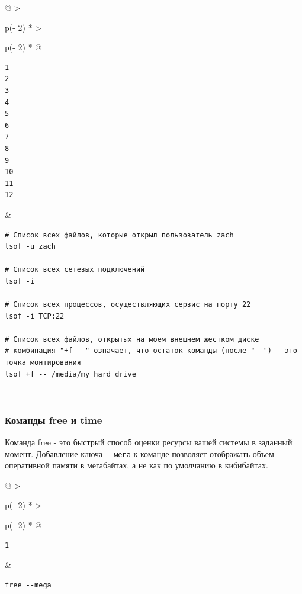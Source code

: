 \documentclass{report}
\begin{document}
\begin{longtable}[]{@{}
  >{\raggedright\arraybackslash}p{(\columnwidth - 2\tabcolsep) * }
  >{\raggedright\arraybackslash}p{(\columnwidth - 2\tabcolsep) * }@{}}
\toprule
\endhead
\begin{minipage}[t]{\linewidth}\raggedright
\begin{verbatim}
1
2
3
4
5
6
7
8
9
10
11
12
\end{verbatim}
\end{minipage} & \begin{minipage}[t]{\linewidth}\raggedright
\begin{verbatim}
# Список всех файлов, которые открыл пользователь zach
lsof -u zach

# Список всех сетевых подключений
lsof -i

# Список всех процессов, осуществляющих сервис на порту 22
lsof -i TCP:22

# Список всех файлов, открытых на моем внешнем жестком диске
# комбинация "+f --" означает, что остаток команды (после "--") - это точка монтирования
lsof +f -- /media/my_hard_drive
\end{verbatim}
\end{minipage} \\ \addlinespace
\bottomrule
\end{longtable}

\hypertarget{free-time}{%
\subsubsection{\texorpdfstring{\protect\hyperlink{free-time}{}Команды
free и time}{Команды free и time}}\label{free-time}}

Команда free - это быстрый способ оценки ресурсы вашей системы в
заданный момент. Добавление ключа \texttt{-\/-мега} к команде позволяет
отображать объем оперативной памяти в мегабайтах, а не как по умолчанию
в кибибайтах.

\begin{longtable}[]{@{}
  >{\raggedright\arraybackslash}p{(\columnwidth - 2\tabcolsep) * }
  >{\raggedright\arraybackslash}p{(\columnwidth - 2\tabcolsep) * }@{}}
\toprule
\endhead
\begin{minipage}[t]{\linewidth}\raggedright
\begin{verbatim}
1
\end{verbatim}
\end{minipage} & \begin{minipage}[t]{\linewidth}\raggedright
\begin{verbatim}
free --mega
\end{verbatim}
\end{minipage} \\ \addlinespace
\bottomrule
\end{longtable}
\end{document}
